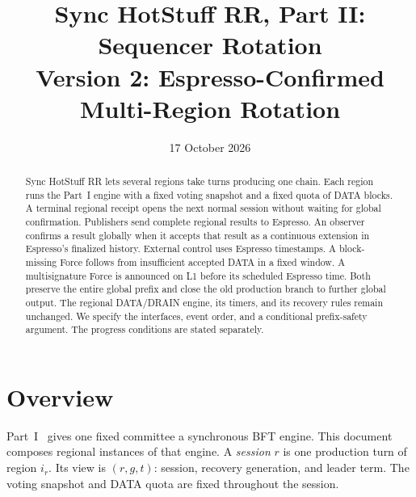 \documentclass[11pt,a4paper]{article}
\title{Sync HotStuff RR, Part II: Sequencer Rotation\\\large Version 2: Espresso-Confirmed Multi-Region Rotation}
\author{}\date{17 October 2026}
\newcommand{\defterm}[1]{\textcolor{rrBlue}{\textit{#1}}}
\begin{document}
\maketitle
\begin{abstract}
Sync HotStuff RR lets several regions take turns producing one chain.
Each region runs the Part~I engine with a fixed voting snapshot and a
fixed quota of DATA blocks. A terminal regional receipt opens the next
normal session without waiting for global confirmation. Publishers send
complete regional results to Espresso. An observer confirms a result
globally when it accepts that result as a continuous extension in
Espresso's finalized history. External control uses Espresso timestamps.
A block-missing Force follows from insufficient accepted DATA in a fixed
window. A multisignature Force is announced on L1 before its scheduled
Espresso time. Both preserve the entire global prefix and close the old
production branch to further global output. The regional DATA/DRAIN
engine, its timers, and its recovery rules remain unchanged. We specify
the interfaces, event order, and a conditional prefix-safety argument.
The progress conditions are stated separately.
\end{abstract}

\section{Overview}
\label{sec:overview}
Part~I~\cite{part1} gives one fixed committee a synchronous BFT engine.
This document composes regional instances of that engine. A
\defterm{session} $r$ is one production turn of region $i_r$.
Its view is $(r,g,t)$: session, recovery generation, and leader term.
The voting snapshot and DATA quota are fixed throughout the session.
\end{document}

